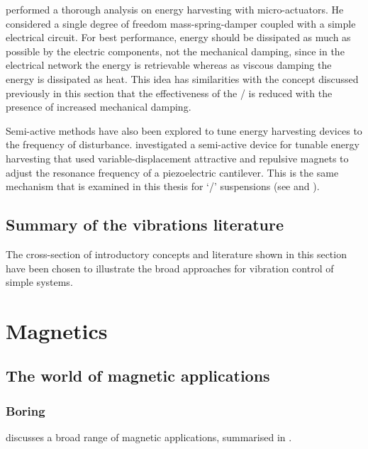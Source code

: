 \textcite{stephen2006} performed a thorough analysis on energy harvesting with micro-actuators.
He considered a single degree of freedom mass-spring-damper coupled with a simple electrical circuit.
For best performance, energy should be dissipated as much as possible by the electric components, not the mechanical damping, since in the electrical network the energy is retrievable whereas as viscous damping the energy is dissipated as heat.
This idea has similarities with the concept discussed previously in this section that the effectiveness of the \vibneut/ is reduced with the presence of increased mechanical damping.

Semi-active methods have also been explored to tune energy harvesting devices to the frequency of disturbance.
\textcite{challa2008} investigated a semi-active device for tunable energy harvesting that used variable-displacement attractive and repulsive magnets to adjust the resonance frequency of a piezoelectric cantilever.
This is the same mechanism that is examined in this thesis for `\qzs/' suspensions (see  and ).



\subsection{Summary of the vibrations literature}

The cross-section of introductory concepts and literature shown in this section have been chosen to illustrate the broad approaches for vibration control of simple systems.



\section{Magnetics}

\subsection{The world of magnetic applications}

\subsubsection{Boring}

\textcite{coey2002} discusses a broad range of magnetic applications,
summarised in .

